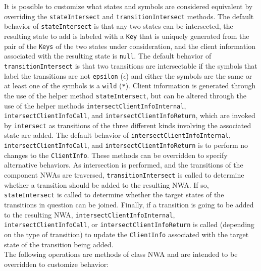 \documentclass{llncs}
\begin{document}
It is possible to customize what states and symbols are considered equivalent by overriding the \texttt{stateIntersect} and \texttt{transitionIntersect} methods.  The default behavior of \texttt{stateIntersect} is that any two states can be intersected, the resulting state to add is labeled with a \texttt{Key} that is uniquely generated from the pair of the \texttt{Keys} of the two states under consideration, and the client information associated with the resulting state is \texttt{null}.  The default behavior of \texttt{transitionIntersect} is that two transitions are intersectable if the symbols that label the transitions are not \texttt{epsilon} (\texttt{$\epsilon$}) and either the symbols are the same or at least one of the symbols is a \texttt{wild} (\texttt{*}). Client information is generated through the use of the helper method \texttt{stateIntersect}, but can be altered through the use of the helper methods \texttt{intersectClientInfoInternal}, \texttt{intersectClientInfoCall}, and  \texttt{intersectClientInfoReturn}, which are invoked by \texttt{intersect} as transitions of the three different kinds involving the associated state are added.  The default behavior of \texttt{intersectClientInfoInternal}, \texttt{intersectClientInfoCall}, and \texttt{intersectClientInfoReturn} is to perform no changes to the \texttt{ClientInfo}.  These methods can be overridden to specify alternative behaviors. As intersection is performed, and the transitions of the component NWAs are traversed, \texttt{transitionIntersect} is called to determine whether a transition should be added to the resulting NWA.  If so, \texttt{stateIntersect} is called to determine whether the target states of the transitions in question can be joined.  Finally, if a transition is going to be added to the resulting NWA, \texttt{intersectClientInfoInternal}, \texttt{intersectClientInfoCall}, or \texttt{intersectClientInfoReturn} is called (depending on the type of transition) to update the \texttt{ClientInfo} associated with the target state of the transition being added. \\

\noindent The following operations are methods of class NWA and are intended to be overridden to customize behavior:
\end{document}

